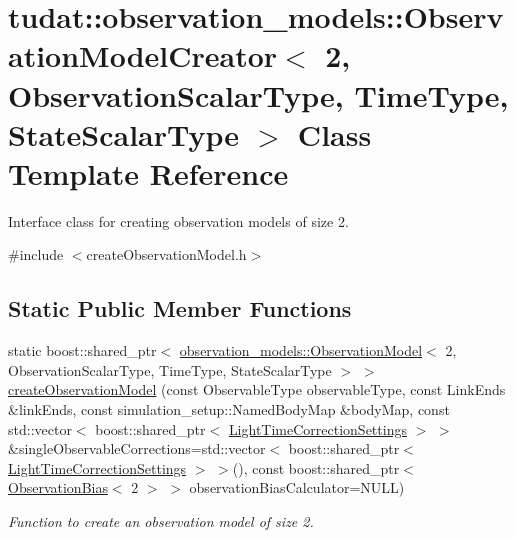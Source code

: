 \hypertarget{classtudat_1_1observation__models_1_1ObservationModelCreator_3_012_00_01ObservationScalarType_0033b5d530be6322c2a034190aca409101}{}\section{tudat\+:\+:observation\+\_\+models\+:\+:Observation\+Model\+Creator$<$ 2, Observation\+Scalar\+Type, Time\+Type, State\+Scalar\+Type $>$ Class Template Reference}
\label{classtudat_1_1observation__models_1_1ObservationModelCreator_3_012_00_01ObservationScalarType_0033b5d530be6322c2a034190aca409101}


Interface class for creating observation models of size 2.  




{\ttfamily \#include $<$create\+Observation\+Model.\+h$>$}

\subsection*{Static Public Member Functions}
\begin{DoxyCompactItemize}
\item 
static boost\+::shared\+\_\+ptr$<$ \hyperlink{classtudat_1_1observation__models_1_1ObservationModel}{observation\+\_\+models\+::\+Observation\+Model}$<$ 2, Observation\+Scalar\+Type, Time\+Type, State\+Scalar\+Type $>$ $>$ \hyperlink{classtudat_1_1observation__models_1_1ObservationModelCreator_3_012_00_01ObservationScalarType_0033b5d530be6322c2a034190aca409101_a212b4ea73060f65431f9b506cf07cae4}{create\+Observation\+Model} (const Observable\+Type observable\+Type, const Link\+Ends \&link\+Ends, const simulation\+\_\+setup\+::\+Named\+Body\+Map \&body\+Map, const std\+::vector$<$ boost\+::shared\+\_\+ptr$<$ \hyperlink{classtudat_1_1observation__models_1_1LightTimeCorrectionSettings}{Light\+Time\+Correction\+Settings} $>$ $>$ \&single\+Observable\+Corrections=std\+::vector$<$ boost\+::shared\+\_\+ptr$<$ \hyperlink{classtudat_1_1observation__models_1_1LightTimeCorrectionSettings}{Light\+Time\+Correction\+Settings} $>$ $>$(), const boost\+::shared\+\_\+ptr$<$ \hyperlink{classtudat_1_1observation__models_1_1ObservationBias}{Observation\+Bias}$<$ 2 $>$ $>$ observation\+Bias\+Calculator=N\+U\+LL)
\begin{DoxyCompactList}\small\item\em Function to create an observation model of size 2. \end{DoxyCompactList}\end{DoxyCompactItemize}


